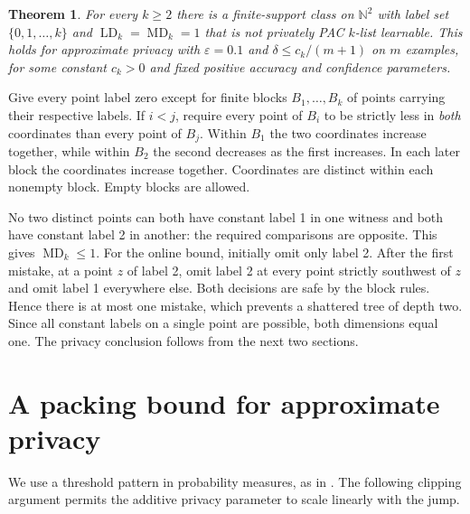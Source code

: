 \documentclass[11pt]{article}
\newtheorem{theorem}{Theorem}
\newcommand{\N}{\mathbb N}
\newcommand{\LD}{\operatorname{LD}}
\newcommand{\MD}{\operatorname{MD}}
\begin{document}
\begin{theorem}\label{main}
For every $k\ge2$ there is a finite-support class on $\N^2$ with label set $\{0,1,\ldots,k\}$ and $\LD_k=\MD_k=1$ that is not privately PAC $k$-list learnable. This holds for approximate privacy with $\varepsilon=0.1$ and $\delta\le c_k/(m+1)$ on $m$ examples, for some constant $c_k>0$ and fixed positive accuracy and confidence parameters.
\end{theorem}
Give every point label zero except for finite blocks $B_1,\ldots,B_k$ of points carrying their respective labels. If $i<j$, require every point of $B_i$ to be strictly less in \emph{both} coordinates than every point of $B_j$. Within $B_1$ the two coordinates increase together, while within $B_2$ the second decreases as the first increases. In each later block the coordinates increase together. Coordinates are distinct within each nonempty block. Empty blocks are allowed.

No two distinct points can both have constant label 1 in one witness and both have constant label 2 in another: the required comparisons are opposite. This gives $\MD_k\le1$. For the online bound, initially omit only label 2. After the first mistake, at a point $z$ of label 2, omit label 2 at every point strictly southwest of $z$ and omit label 1 everywhere else. Both decisions are safe by the block rules. Hence there is at most one mistake, which prevents a shattered tree of depth two. Since all constant labels on a single point are possible, both dimensions equal one. The privacy conclusion follows from the next two sections.

\section{A packing bound for approximate privacy}
We use a threshold pattern in probability measures, as in \cite[Appendix C]{hmst}. The following clipping argument permits the additive privacy parameter to scale linearly with the jump.
\end{document}
